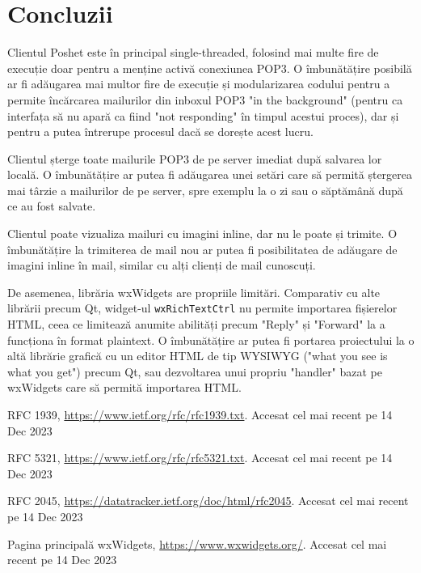 \documentclass[runningheads]{llncs}
\begin{document}
\newpage

\section{Concluzii}

Clientul Poshet este în principal single-threaded, folosind mai multe fire de execuție doar pentru a menține activă conexiunea POP3. O îmbunătățire posibilă ar fi adăugarea mai multor fire de execuție și modularizarea codului pentru a permite încărcarea mailurilor din inboxul POP3 "in the background" (pentru ca interfața să nu apară ca fiind "not responding" în timpul acestui proces), dar și pentru a putea întrerupe procesul dacă se dorește acest lucru.

Clientul șterge toate mailurile POP3 de pe server imediat după salvarea lor locală. O îmbunătățire ar putea fi adăugarea unei setări care să permită ștergerea mai târzie a mailurilor de pe server, spre exemplu la o zi sau o săptămână după ce au fost salvate.

Clientul poate vizualiza mailuri cu imagini inline, dar nu le poate și trimite. O îmbunătățire la trimiterea de mail nou ar putea fi posibilitatea de adăugare de imagini inline în mail, similar cu alți clienți de mail cunoscuți.

De asemenea, librăria wxWidgets are propriile limitări. Comparativ cu alte librării precum Qt, widget-ul \texttt{wxRichTextCtrl} nu permite importarea fișierelor HTML, ceea ce limitează anumite abilități precum "Reply" și "Forward" la a funcționa în format plaintext. O îmbunătățire ar putea fi portarea proiectului la o altă librărie grafică cu un editor HTML de tip WYSIWYG ("what you see is what you get") precum Qt, sau dezvoltarea unui propriu "handler" bazat pe wxWidgets care să permită importarea HTML.
%
%
%
% 
% 

\begin{thebibliography}{8}
RFC 1939, \url{https://www.ietf.org/rfc/rfc1939.txt}. Accesat cel mai recent pe 14 Dec 2023

RFC 5321, \url{https://www.ietf.org/rfc/rfc5321.txt}. Accesat cel mai recent pe 14 Dec 2023

RFC 2045, \url{https://datatracker.ietf.org/doc/html/rfc2045}. Accesat cel mai recent pe 14 Dec 2023

Pagina principală wxWidgets, \url{https://www.wxwidgets.org/}. Accesat cel mai recent pe 14 Dec 2023


\end{thebibliography}
\end{document}

